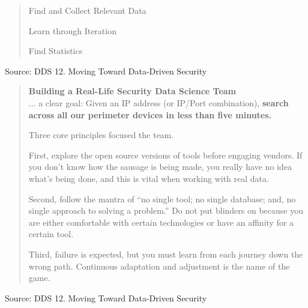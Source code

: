 \documentclass[Screen16to9,17pt]{foils}
\begin{document}


\begin{quote}
\begin{list2}
\item Find and Collect Relevant Data
\item Learn through Iteration
\item Find Statistics
\end{list2}

\end{quote}
Source: DDS 12. Moving Toward Data-Driven Security




\begin{quote}{\bf
Building a Real-Life Security Data Science Team}\\

... a clear goal: Given an IP address (or IP/Port combination), {\bf search across all our perimeter devices in less than five minutes.}

Three core principles focused the team.
\begin{list2}
\item First, explore the open source versions of tools before engaging vendors. If you don’t
know how the sausage is being made, you really have no idea what’s being done, and
this is vital when working with real data.
\item Second, follow the mantra of “no single tool; no single database; and, no single approach
to solving a problem.” Do not put blinders on because you are either comfortable with
certain technologies or have an affinity for a certain tool.
\item Third, failure is expected, but you must learn from each journey down the wrong path.
Continuous adaptation and adjustment is the name of the game.
\end{list2}
\end{quote}

Source: DDS 12. Moving Toward Data-Driven Security







\begin{quote}

\end{quote}
\end{document}
